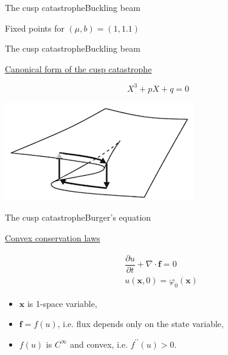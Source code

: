 \documentclass[aspectratio=169]{beamer}
\begin{document}
{\begin{frame}[t, c]{The cusp catastrophe}{\small Buckling beam}
\begin{minipage}{.48\textwidth}
      Fixed points for $(\mu, b) = (1, 1.1)$
    \end{minipage}
    
    \vfill
  \end{frame}
  
  \begin{frame}[t, c]{The cusp catastrophe}{\small Buckling beam}
    \vfill
    \large
    
    \begin{minipage}{.48\textwidth}
      \centering
      \underline{Canonical form of the cusp catastrophe}
      
      \[
      X^3 + p X + q = 0
      \]
    \end{minipage}%
    \hfill
    \begin{minipage}{.48\textwidth}
      \centering
      \includegraphics[width=\textwidth]{cusp}
    \end{minipage}
    
    \vfill
  \end{frame}

  \begin{frame}[t, c]{The cusp catastrophe}{\small Burger's equation}
    \vfill
    \large

    \begin{minipage}{.48\textwidth}
      \centering
      \underline{Convex conservation laws}

      \[
      \begin{aligned}
        & \dfrac{\partial u}{\partial t} + \nabla \cdot \bm{f} = 0 \\
        & u(\bm{x}, 0) = \varphi_0(\bm{x})
      \end{aligned}
      \]
    \end{minipage}%
    \hfill
    \begin{minipage}{.48\textwidth}
      \begin{itemize}
      \item $\bm{x}$ is 1-space variable,
      \item $\bm{f} = f(u)$, i.e. flux depends only on the state variable,
      \item $f(u)$ is $C^{\infty}$ and convex, i.e. $f^{\prime\prime}(u) > 0$.
      \end{itemize}
    \end{minipage}


\end{frame}}
\end{document}
